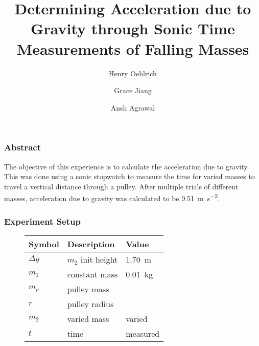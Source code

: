 \documentclass{beamer}
\title{Determining Acceleration due to Gravity through Sonic Time Measurements of Falling Masses}
\author{Henry Oehlrich\and Grace Jiang\and Ansh Agrawal}
\begin{document}
\maketitle

\begin{frame}
    \frametitle{Abstract}
    The objective of this experience is to calculate the acceleration due to
    gravity. This was done using a sonic stopwatch to measure the time for
    varied masses to travel a vertical distance through a pulley. After
    multiple trials of different masses, acceleration due to gravity was
    calculated to be \qty{9.51}{\meter\per\second\squared}. 
\end{frame}

\begin{frame}
    \frametitle{Experiment Setup}
    \begin{minipage}{0.65\textwidth}
        \begin{figure}
            \centering
            \begin{tabular}{l|l|l}
                \toprule
                Symbol & Description &  Value \\
                \midrule
                $\Delta y$ & $m_2$ init height & \qty{1.70}{\meter} \\
                $m_1$ & constant mass & \qty{0.01}{\kilogram} \\
                $m_p$ & pulley mass & \\
                $r$ & pulley radius & \\
                $m_2$ & varied mass & varied \\
                $t$ & time & measured \\
            \end{tabular}
        \end{figure}
    \end{minipage}%
    \begin{minipage}{0.35\textwidth}
        \begin{figure}
            \centering
        \end{figure}
    \end{minipage}
\end{frame}
\end{document}

